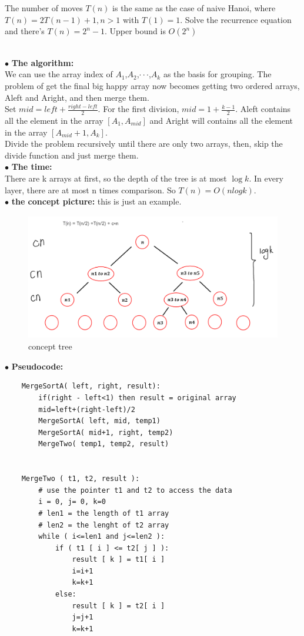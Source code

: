 \documentclass[12pt,a4paper]{article}
\newcommand{\question}[1]{\bigskip\noindent{\textbf{Q{#1} solution}}}
\begin{document}
The number of moves $T(n)$ is the same as the case of naive Hanoi, where $T(n) = 2T(n - 1) + 1, n > 1$ with $T(1) = 1$. Solve the recurrence equation and there's $T(n) = 2^n - 1$. Upper bound is $O(2^n)$


\question{14.A}\\
$\bullet$ \textbf{The algorithm:}\\
We can use the array index of $A_1$,$A_2$,$\cdot \cdot \cdot$,$A_k$ as the basis for grouping. The problem of get the final big happy array now becomes  getting two ordered arrays, Aleft and Aright, and then merge them.\\
Set $mid = left+\frac{right-left}{2}$. For the first division, $mid = 1+\frac{k-1}{2}$. Aleft contains all the element in the array $[A_1,A_{mid}]$ and Aright will contains all the element in the array $[A_{mid}+1,A_k]$.\\
Divide the problem recursively until there are only two arrays, then, skip the divide function and just merge them.\\
$\bullet$ \textbf{The time:}\\
There are k arrays at first, so the depth of the tree is at most $\log{k}$. In every layer, there are at most n times comparison. So $T(n) = O(nlogk)$.\\
$\bullet$ \textbf{the concept picture:} this is just an example.
	\begin{figure}[H]
	\centering %
	\includegraphics[height=5.5cm,width=12.5cm]{picture//Q14A.png}
	\caption{concept tree}
	\end{figure}
$\bullet$ \textbf{Pseudocode:}
	\begin{lstlisting}
	MergeSortA( left, right, result):
		if(right - left<1) then result = original array
		mid=left+(right-left)/2
		MergeSortA( left, mid, temp1)
		MergeSortA( mid+1, right, temp2)
		MergeTwo( temp1, temp2, result)


	MergeTwo ( t1, t2, result ):
		# use the pointer t1 and t2 to access the data
		i = 0, j= 0, k=0
		# len1 = the length of t1 array
		# len2 = the lenght of t2 array
		while ( i<=len1 and j<=len2 ):
			if ( t1 [ i ] <= t2[ j ] ):
				result [ k ] = t1[ i ]
				i=i+1
				k=k+1
			else:
				result [ k ] = t2[ i ]
				j=j+1
				k=k+1
	\end{lstlisting}
\end{document}
